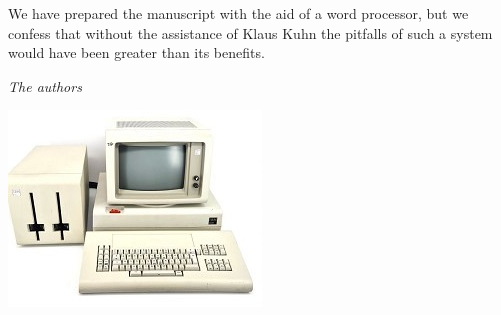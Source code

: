 We have prepared the manuscript with the aid of a word processor, but we confess that without the assistance of Klaus Kuhn the pitfalls of such a system would have been greater than its benefits.
\vspace{.5cm}
\begin{flushright}\noindent
${}$\hfill {\itshape The authors} \\
\end{flushright}

\vspace{.5cm}
\begin{center}
\includegraphics{./part-0/apparaetle.jpg}
\end{center}



